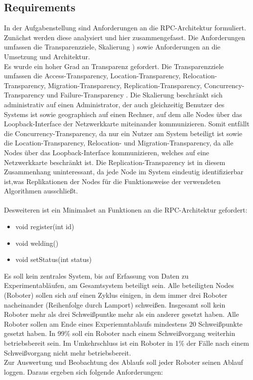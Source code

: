 \subsection{Requirements}
In der Aufgabenstellung sind Anforderungen an die RPC-Architektur formuliert.
Zunächst werden diese analysiert und hier zusammengefasst.
Die Anforderungen umfassen die Transparenzziele, Skalierung \cite{tanenbaumvansteen}) sowie Anforderungen
an die Umsetzung und Architektur.\\
Es wurde ein hoher Grad an Transparenz gefordert.
Die Transparenzziele umfassen die Access-Transparency, Location-Transparency, Relocation-Transparency,
Migration-Transparency, Replication-Transparency, Concurrency-Transparency und Failure-Transparency \citep{tanenbaumvansteen}.
Die Skalierung beschränkt sich administrativ auf einen Administrator, der auch gleichzeitig
Benutzer des Systems ist sowie geographisch auf einen Rechner, auf dem alle Nodes 
\citep{tanenbaumvansteen} über das Loopback-Interface der Netzwerkkarte miteinander kommunizieren.
Somit entfällt die Concurrency-Transparency, da nur ein Nutzer am System beteiligt ist sowie die
Location-Transparency, Relocation- und Migration-Transparency, da alle Nodes über das Loopback-Interface
kommunizieren, welches auf eine Netzwerkkarte beschränkt ist. Die Replication-Transparency ist in diesem Zusammenhang 
uninteressant, da jede Node im System eindeutig identifizierbar ist,was Replikationen der Nodes für die Funktionsweise 
der verwendeten Algorithmen ausschließt.\\\\
Desweiteren ist ein Minimalset an Funktionen an die RPC-Architektur gefordert:
\begin{itemize}
  \item void register(int id)
  \item void welding()
  \item void setStatus(int status)
\end{itemize}
Es soll kein zentrales System, bis auf Erfassung von Daten zu Experimentabläufen, am Gesamtsystem beteiligt
sein.
Alle beteiligten Nodes (Roboter) sollen sich auf einen Zyklus einigen, in dem immer drei Roboter nacheinander
(Reihenfolge durch Lamport) schweißen.
Insgesamt soll kein Roboter mehr als drei Schweißpuntke mehr als ein anderer gesetzt haben.
Alle Roboter sollen am Ende eines Experiemntablaufs mindestens 20 Schweißpunkte gesetzt haben.
In 99\% soll ein Roboter nach einem Schweißvorgang weiterhin betriebsbereit sein. Im Umkehrschluss
ist ein Roboter in 1\% der Fälle nach einem Schweißvorgang nicht mehr betriebsbereit.\\
Zur Auswertung und Beobachtung des Ablaufs soll jeder Roboter seinen Ablauf loggen.
Daraus ergeben sich folgende Anforderungen:

